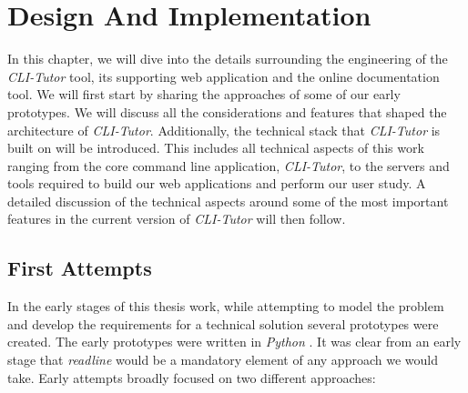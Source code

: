 \chapter{Design And Implementation} %
\label{chap:design}


In this chapter, we will dive into the details surrounding the engineering of
the \textit{CLI-Tutor} tool, its supporting web application and the online
documentation tool. We will first start by sharing the approaches of some of
our early prototypes. We will discuss all the considerations and features that
shaped the architecture of \textit{CLI-Tutor}. Additionally, the technical
stack that \textit{CLI-Tutor} is built on will be introduced. This includes all
technical aspects of this work ranging from the core command line application,
\textit{CLI-Tutor}, to the servers and tools required to build our web
applications and perform our user study. A detailed discussion of the technical
aspects around some of the most important features in the current version of
\textit{CLI-Tutor} will then follow.  


\section{First Attempts} In the early stages of this thesis work, while
attempting to model the problem and develop the requirements for a technical
solution several prototypes were created. The early prototypes were written in
\textit{Python} \cite{python}. It was clear from an early stage that
\textit{readline} would be a mandatory element of any approach we would take.
Early attempts broadly focused on two different approaches:

